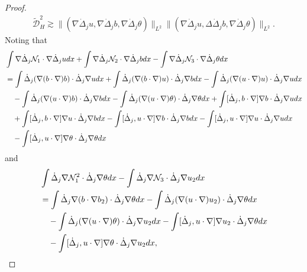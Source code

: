 \documentclass[10pt,a4paper]{amsart}
\numberwithin{equation}{section}
\begin{document}
\begin{proof}
\begin{equation}
\begin{gathered}
 \tilde{\mathcal{D}}_H^2\gtrsim\|(\nabla\dot{\Delta}_ju,\nabla\dot{\Delta}_jb,\nabla\dot{\Delta}_j\theta)\|_{L^2}\|(\nabla\dot{\Delta}_ju,\Delta\dot{\Delta}_jb,\nabla\dot{\Delta}_j\theta)\|_{L^2}.
\end{gathered}
\end{equation}
Noting that
\begin{align*}
&\int\nabla\dot{\Delta}_j \mathcal{N}_1\cdot \nabla\dot{\Delta}_ju{\rm d}x
 +\int\nabla\dot{\Delta}_j \mathcal{N}_2\cdot\nabla \dot{\Delta}_jb{\rm d}x
 -\int\nabla\dot{\Delta}_j \mathcal{N}_3\cdot \nabla\dot{\Delta}_j\theta{\rm d}x \\
&=\int\dot{\Delta}_j(\nabla (b\cdot\nabla) b)\cdot\dot{\Delta}_j\nabla u{\rm d}x
 +\int\dot{\Delta}_j(\nabla (b\cdot\nabla) u)\cdot\dot{\Delta}_j\nabla b{\rm d}x
 -\int\dot{\Delta}_j(\nabla (u\cdot\nabla) u)\cdot\dot{\Delta}_j\nabla u{\rm d}x \\
&\quad-\int\dot{\Delta}_j(\nabla (u\cdot\nabla) b)\cdot\dot{\Delta}_j\nabla b{\rm d}x
 -\int\dot{\Delta}_j(\nabla (u\cdot\nabla) \theta)\cdot\dot{\Delta}_j\nabla \theta{\rm d}x
 +\int[\dot{\Delta}_j, b\cdot\nabla]\nabla b\cdot\dot{\Delta}_j\nabla u{\rm d}x \\
 &\quad +\int[\dot{\Delta}_j, b\cdot\nabla]\nabla u\cdot\dot{\Delta}_j\nabla b{\rm d}x
 -\int[\dot{\Delta}_j, u\cdot\nabla]\nabla b\cdot\dot{\Delta}_j\nabla b{\rm d}x
 -\int[\dot{\Delta}_j, u\cdot\nabla]\nabla u\cdot\dot{\Delta}_j\nabla u{\rm d}x \\
&\quad -\int[\dot{\Delta}_j, u\cdot\nabla]\nabla \theta\cdot\dot{\Delta}_j\nabla 
 \theta{\rm d}x
\end{align*}
and
\begin{equation}\label{3.20}
\begin{aligned}
&\int\dot{\Delta}_j\nabla \mathcal{N}_1^2\cdot\dot{\Delta}_j\nabla\theta{\rm d}x
 -\int\dot{\Delta}_j\nabla\mathcal{N}_3\cdot\dot{\Delta}_j\nabla u_2{\rm d}x \\
&=\int\dot{\Delta}_j\nabla (b\cdot\nabla b_2)\cdot\dot{\Delta}_j\nabla \theta{\rm d}x
 -\int\dot{\Delta}_j(\nabla (u\cdot\nabla) u_2)\cdot\dot{\Delta}_j\nabla \theta{\rm d}x\\
&\quad -\int\dot{\Delta}_j(\nabla (u\cdot\nabla) \theta)
 \cdot\dot{\Delta}_j\nabla u_2{\rm d}x
 -\int[\dot{\Delta}_j, u\cdot\nabla]\nabla u_2\cdot\dot{\Delta}_j\nabla \theta{\rm d}x \\
&\quad -\int[\dot{\Delta}_j, u\cdot\nabla]\nabla \theta\cdot\dot{\Delta}_j\nabla u_2{\rm d}x,

\end{aligned}
\end{equation}
\end{proof}
\end{document}
